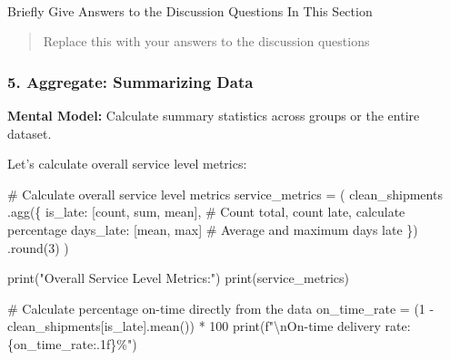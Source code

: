 \documentclass[
  letterpaper,
  DIV=11,
  numbers=noendperiod]{scrartcl}
\makeatletter
\let\oldparagraph\paragraph
\renewcommand{\paragraph}{
    \@ifstar
      \xxxParagraphStar
      \xxxParagraphNoStar
  }
\newcommand{\xxxParagraphStar}[1]{\oldparagraph*{#1}\mbox{}}
\newcommand{\xxxParagraphNoStar}[1]{\oldparagraph{#1}\mbox{}}
\newenvironment{Shaded}{\begin{snugshade}}{\end{snugshade}}
\newcommand{\BuiltInTok}[1]{\textcolor[rgb]{0.00,0.23,0.31}{#1}}
\newcommand{\CharTok}[1]{\textcolor[rgb]{0.13,0.47,0.30}{#1}}
\newcommand{\CommentTok}[1]{\textcolor[rgb]{0.37,0.37,0.37}{#1}}
\newcommand{\DecValTok}[1]{\textcolor[rgb]{0.68,0.00,0.00}{#1}}
\newcommand{\NormalTok}[1]{\textcolor[rgb]{0.00,0.23,0.31}{#1}}
\newcommand{\OperatorTok}[1]{\textcolor[rgb]{0.37,0.37,0.37}{#1}}
\newcommand{\SpecialCharTok}[1]{\textcolor[rgb]{0.37,0.37,0.37}{#1}}
\newcommand{\SpecialStringTok}[1]{\textcolor[rgb]{0.13,0.47,0.30}{#1}}
\newcommand{\StringTok}[1]{\textcolor[rgb]{0.13,0.47,0.30}{#1}}
\makeatother
\begin{document}
\paragraph{Briefly Give Answers to the Discussion Questions In This
Section}\label{briefly-give-answers-to-the-discussion-questions-in-this-section-3}

\begin{quote}
Replace this with your answers to the discussion questions
\end{quote}

\subsubsection{5. Aggregate: Summarizing
Data}\label{aggregate-summarizing-data}

\textbf{Mental Model:} Calculate summary statistics across groups or the
entire dataset.

Let's calculate overall service level metrics:

\label{mental-model-5-aggregate}
\begin{Shaded}
\begin{Highlighting}[]
\CommentTok{\# Calculate overall service level metrics}
\NormalTok{service\_metrics }\OperatorTok{=}\NormalTok{ (}
\NormalTok{    clean\_shipments}
\NormalTok{    .agg(\{}
        \StringTok{\textquotesingle{}is\_late\textquotesingle{}}\NormalTok{: [}\StringTok{\textquotesingle{}count\textquotesingle{}}\NormalTok{, }\StringTok{\textquotesingle{}sum\textquotesingle{}}\NormalTok{, }\StringTok{\textquotesingle{}mean\textquotesingle{}}\NormalTok{],  }\CommentTok{\# Count total, count late, calculate percentage}
        \StringTok{\textquotesingle{}days\_late\textquotesingle{}}\NormalTok{: [}\StringTok{\textquotesingle{}mean\textquotesingle{}}\NormalTok{, }\StringTok{\textquotesingle{}max\textquotesingle{}}\NormalTok{]  }\CommentTok{\# Average and maximum days late}
\NormalTok{    \})}
\NormalTok{    .}\BuiltInTok{round}\NormalTok{(}\DecValTok{3}\NormalTok{)}
\NormalTok{)}

\BuiltInTok{print}\NormalTok{(}\StringTok{"Overall Service Level Metrics:"}\NormalTok{)}
\BuiltInTok{print}\NormalTok{(service\_metrics)}

\CommentTok{\# Calculate percentage on{-}time directly from the data}
\NormalTok{on\_time\_rate }\OperatorTok{=}\NormalTok{ (}\DecValTok{1} \OperatorTok{{-}}\NormalTok{ clean\_shipments[}\StringTok{\textquotesingle{}is\_late\textquotesingle{}}\NormalTok{].mean()) }\OperatorTok{*} \DecValTok{100}
\BuiltInTok{print}\NormalTok{(}\SpecialStringTok{f"}\CharTok{\textbackslash{}n}\SpecialStringTok{On{-}time delivery rate: }\SpecialCharTok{\{}\NormalTok{on\_time\_rate}\SpecialCharTok{:.1f\}}\SpecialStringTok{\%"}\NormalTok{)}
\end{Highlighting}
\end{Shaded}
\end{document}
